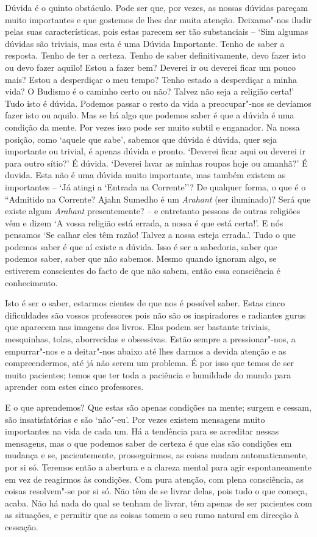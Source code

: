 Dúvida é o quinto obstáculo. Pode ser que, por vezes, as nossas dúvidas
pareçam muito importantes e que gostemos de lhes dar muita atenção.
Deixamo"-nos iludir pelas suas características, pois estas parecem ser tão
substanciais -- `Sim algumas dúvidas são triviais, mas esta é uma Dúvida
Importante. Tenho de saber a resposta. Tenho de ter a certeza. Tenho de
saber definitivamente, devo fazer isto ou devo fazer aquilo! Estou a
fazer bem? Deverei ir ou deverei ficar um pouco mais? Estou a
desperdiçar o meu tempo? Tenho estado a desperdiçar a minha vida? O
Budismo é o caminho certo ou não? Talvez não seja a religião certa!'
Tudo isto é dúvida. Podemos passar o resto da vida a preocupar"-nos se
devíamos fazer isto ou aquilo. Mas se há algo que podemos
saber é que a dúvida é uma condição da mente. Por vezes isso
pode ser muito subtil e enganador. Na nossa posição, como `aquele que
sabe', sabemos que dúvida é dúvida, quer seja importante ou trivial, é
apenas dúvida e pronto. `Deverei ficar aqui ou deverei ir para outro
sítio?' É dúvida. `Deverei lavar as minhas roupas hoje ou amanhã?' É
duvida. Esta não é uma dúvida muito importante, mas também existem as
importantes -- `Já atingi a `Entrada na Corrente''? De qualquer forma, o
que é o ``Admitido na Corrente? Ajahn Sumedho é um \emph{Arahant} (ser
iluminado)? Será que existe algum \emph{Arahant} presentemente? -- e
entretanto pessoas de outras religiões vêm e dizem `A vossa religião
está errada, a nossa é que está certa!'. E nós pensamos `Se calhar eles
têm razão! Talvez a nossa esteja errada.'. Tudo o que podemos saber é
que aí existe a dúvida. Isso é ser a sabedoria, saber que podemos saber,
saber que não sabemos. Mesmo quando ignoram algo, se estiverem
conscientes do facto de que não sabem, então essa consciência é
conhecimento.

Isto é ser o saber, estarmos cientes de que nos é possível saber. Estas
cinco dificuldades são vossos professores pois não são os inspiradores e
radiantes gurus que aparecem nas imagens dos livros. Elas podem ser
bastante triviais, mesquinhas, tolas, aborrecidas e obsessivas. Estão
sempre a pressionar"-nos, a empurrar"-nos e a deitar"-nos abaixo até lhes
darmos a devida atenção e as compreendermos, até já não serem um problema. 
É por isso que temos de ser muito pacientes; temos que ter toda a
paciência e humildade do mundo para aprender com estes cinco
professores.

E o que aprendemos? Que estas são apenas condições na mente; surgem e
cessam, são insatisfatórias e são `não"-eu'. Por vezes existem mensagens
muito importantes na vida de cada um. Há a tendência para se acreditar
nessas mensagens, mas o que podemos saber de certeza é que elas são
condições em mudança e se, pacientemente, prosseguirmos, as coisas mudam
automaticamente, por si só. Teremos então a abertura e a clareza mental
para agir espontaneamente em vez de reagirmos às condições. Com pura
atenção, com plena consciência, as coisas resolvem"-se por si só. Não têm
de se livrar delas, pois tudo o que começa, acaba. Não há nada do
qual se tenham de livrar, têm apenas de ser pacientes com as situações,
e permitir que as coisas tomem o seu rumo natural em direcção à
cessação.

